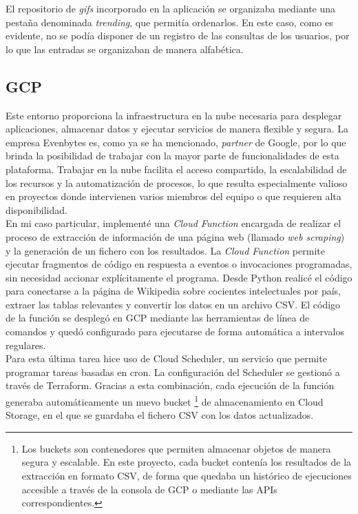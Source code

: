 El repositorio de \textit{gifs} incorporado en la aplicación se organizaba mediante una pestaña denominada \textit{trending}, que permitía ordenarlos. En este caso, como es evidente, no se podía disponer de un registro de las consultas de los usuarios, por lo que las entradas se organizaban de manera alfabética.
%
%
\subsection{GCP}
%
%
Este entorno proporciona la infraestructura en la nube necesaria para desplegar aplicaciones, almacenar datos y ejecutar servicios de manera flexible y segura. La empresa Evenbytes es, como ya se ha mencionado, \textit{partner} de Google, por lo que brinda la posibilidad de trabajar con la mayor parte de funcionalidades de esta plataforma. Trabajar en la nube facilita el acceso compartido, la escalabilidad de los recursos y la automatización de procesos, lo que resulta especialmente valioso en proyectos donde intervienen varios miembros del equipo o que requieren alta disponibilidad.\\

En mi caso particular, implementé una \textit{Cloud Function} encargada de realizar el proceso de extracción de información de una página web (llamado \textit{web scraping}) y la generación de un fichero con los resultados. La \textit{Cloud Function} permite ejecutar fragmentos de código en respuesta a eventos o invocaciones programadas, sin necesidad accionar explícitamente el programa. Desde Python realicé el código para conectarse a la página de Wikipedia sobre cocientes intelectuales por país, extraer las tablas relevantes y convertir los datos en un archivo CSV. El código de la función se desplegó en GCP mediante las herramientas de línea de comandos y quedó configurado para ejecutarse de forma automática a intervalos regulares.\\

Para esta última tarea hice uso de Cloud Scheduler, un servicio que permite programar tareas basadas en cron. La configuración del Scheduler se gestionó a través de Terraform. Gracias a esta combinación, cada ejecución de la función generaba automáticamente un nuevo bucket \footnote{
Los buckets son contenedores que permiten almacenar objetos de manera segura y escalable. En este proyecto, cada bucket contenía los resultados de la extracción en formato CSV, de forma que quedaba un histórico de ejecuciones accesible a través de la consola de GCP o mediante las APIs correspondientes.} de almacenamiento en Cloud Storage, en el que se guardaba el fichero CSV con los datos actualizados.\\

